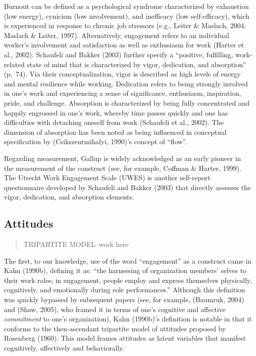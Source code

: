 \documentclass[
  man]{apa7}
\begin{document}
Burnout can be defined as a psychological syndrome characterized by exhaustion (low energy), cynicism (low involvement), and inefficacy (low self-efficacy), which is experienced in response to chronic job stressors (e.g., Leiter \& Maslach, 2004; Maslach \& Leiter, 1997). Alternatively, engagement refers to an individual worker's involvement and satisfaction as well as enthusiasm for work (Harter et al., 2002). Schaufeli and Bakker (2003) further specify a ``positive, fulfilling, work-related state of mind that is characterized by vigor, dedication, and absorption'' (p.~74). Via their conceptualization, vigor is described as high levels of energy and mental resilience while working. Dedication refers to being strongly involved in one's work and experiencing a sense of significance, enthusiasm, inspiration, pride, and challenge. Absorption is characterized by being fully concentrated and happily engrossed in one's work, whereby time passes quickly and one has difficulties with detaching oneself from work (Schaufeli et al., 2002). The dimension of absorption has been noted as being influenced in conceptual specification by (Csikszentmihalyi, 1990)'s concept of ``flow''.

Regarding measurement, Gallup is widely acknowledged as an early pioneer in the measurement of the construct (see, for example, Coffman \& Harter, 1999). The Utrecht Work Engagement Scale (UWES) is another self-report questionnaire developed by Schaufeli and Bakker (2003) that directly assesses the vigor, dedication, and absorption elements.

\hypertarget{attitudes}{%
\subsection{Attitudes}\label{attitudes}}

\begin{quote}
TRIPARTITE MODEL--work here
\end{quote}

The first, to our knowledge, use of the word ``engagement'' as a construct came in Kahn (1990b), defining it as: ``the harnessing of organization members' selves to their work roles; in engagement, people employ and express themselves physically, cognitively, and emotionally during role performances.'' Although this definition was quickly bypassed by subsequent papers (see, for example, (Baumruk, 2004) and (Shaw, 2005), who framed it in terms of one's cognitive and affective \emph{commitment} to one's organization), Kahn (1990b)'s definition is notable in that it conforms to the then-ascendant tripartite model of attitudes proposed by Rosenberg (1960). This model frames attitudes as latent variables that manifest cognitively, affectively and behaviorally.
\end{document}
